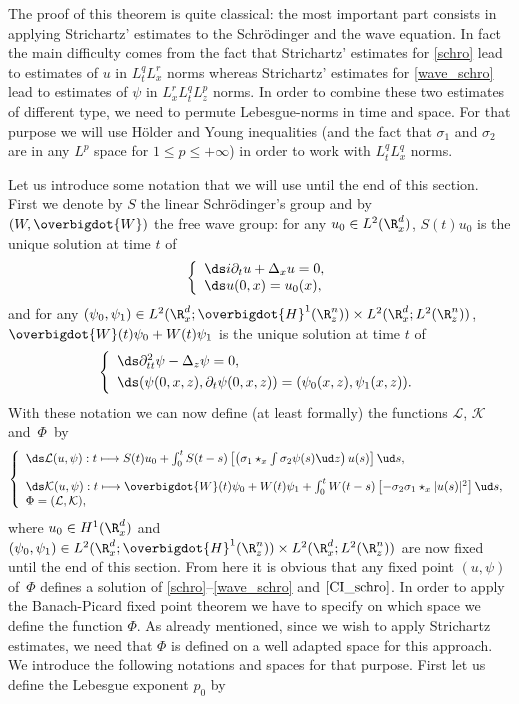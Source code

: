 The proof of this theorem is quite classical: the most important part consists in applying Strichartz' estimates to the Schrödinger and the wave equation. In fact the main difficulty comes from the fact that Strichartz' estimates for \eqref{schro} lead to estimates of $u$ in $L_{t}^{q}L_{x}^{r}$ norms whereas Strichartz' estimates for \eqref{wave_schro} lead to estimates of $\psi$ in $L_{x}^{r}L_{t}^{q}L_{z}^{p}$ norms. In order to combine these two estimates
of different type,
we need to permute Lebesgue-norms in time and space. For that purpose we will use Hölder and Young inequalities (and the fact that $\sigma_{1}$ and $\sigma_{2}$ are in any $L^{p}$ space for $1\leq p\leq+\infty$) in order to work with $L_{t}^{q}L_{x}^{q}$ norms.

Let us introduce some notation that we will use until the end of this section. First we denote by $S$ the linear Schrödinger's group and by $(W,\overbigdot{W})$ the free wave group: for any $u_{0}\in L^{2}(\R_{x}^{d})$, $S(t)u_{0}$ is the unique solution at time $t$ of
\[
\left\{\begin{array}{l}
\ds i\partial_{t}u+\Delta_{x}u=0,\\
\ds u(0,x)=u_{0}(x),
\end{array}\right.
\]
and for any $(\psi_{0},\psi_{1})\in L^{2}(\R_{x}^{d};\overbigdot{H}^{1}(\R_{z}^{n}))\times L^{2}(\R_{x}^{d};L^{2}(\R_{z}^{n}))$, $\overbigdot{W}(t)\psi_{0}+W(t)\psi_{1}$ is the unique solution at time $t$ of
\[
\left\{\begin{array}{l}
\ds \partial_{tt}^{2}\psi-\Delta_{z}\psi=0,\\[3pt]
\ds (\psi(0,x,z),\partial_{t}\psi(0,x,z))=(\psi_{0}(x,z),\psi_{1}(x,z)).
\end{array}\right.
\]
With these notation we can now define (at least formally) the functions $\mathcal{L}$, $\mathcal{K}$ and~$\Phi$~by
\[
\left\{\begin{array}{l}
\ds \mathcal{L}(u,\psi):t\longmapsto S(t)u_{0}+\int_{0}^{t}S(t-s)\left[\left(\sigma_{1}\star_{x}\int\sigma_{2}\psi(s)\ud z\right)u(s)\right]\ud s,\\[10pt]
\ds\mathcal{K}(u,\psi):t\longmapsto \overbigdot{W}(t)\psi_{0}+W(t)\psi_{1}+\int_{0}^{t}W(t-s)\left[-\sigma_{2}\sigma_{1}\star_{x}|u(s)|^{2}\right]\ud s,\\
\Phi=(\mathcal{L},\mathcal{K}),
\end{array}\right.
\]
where $u_{0}\in H^{1}(\R_{x}^{d})$ and $(\psi_{0},\psi_{1})\in L^{2}(\R_{x}^{d};\overbigdot{H}^{1}(\R_{z}^{n}))\times L^{2}(\R_{x}^{d};L^{2}(\R_{z}^{n}))$ are now fixed until the end of this section. From here it is obvious that any fixed point $(u,\psi)$ of~$\Phi$ defines a solution of \eqref{schro}--\eqref{wave_schro} and $\eqref{CI_schro}$. In order to apply the Banach-Picard fixed point theorem we have to specify on which space we define the function $\Phi$. As already mentioned, since we wish to apply Strichartz estimates, we need that $\Phi$ is defined on a well adapted space for this approach. We introduce the following notations and spaces for that purpose. First let us define the Lebesgue exponent $p_{0}$ by
